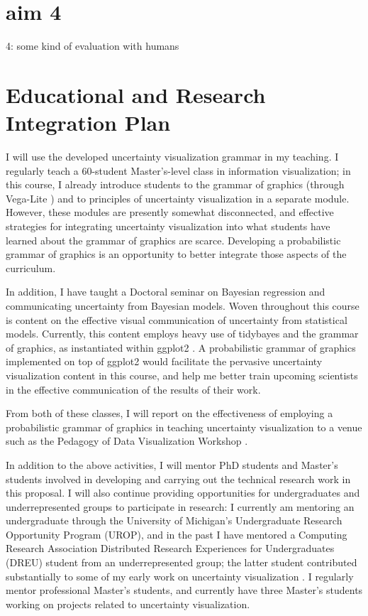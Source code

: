 \documentclass[11pt]{article}
\begin{document}
\section{aim 4}

4: some kind of evaluation with humans

\section{Educational and Research Integration Plan}

\noindent I will use the developed uncertainty visualization grammar in my teaching. I regularly teach a 60-student Master's-level class in information visualization; in this course, I already introduce students to the
grammar of graphics (through Vega-Lite \cite{satyanarayan2017vega}) and to principles of uncertainty visualization in a separate module. However, these modules are presently somewhat disconnected, and effective strategies for
integrating uncertainty visualization into what students have learned about the grammar of graphics are scarce. Developing a probabilistic grammar of graphics is an opportunity to better integrate those aspects
of the curriculum.

In addition, I have taught a Doctoral seminar on Bayesian regression and communicating uncertainty from Bayesian models. Woven throughout this course is content on the effective visual communication of uncertainty
from statistical models. Currently, this content employs heavy use of tidybayes \cite{kay2017tidybayes} and the grammar of graphics, as instantiated within ggplot2 \cite{wickham2016ggplot2}. A probabilistic grammar of graphics implemented on top of ggplot2 would facilitate the pervasive uncertainty visualization content in this course, and help me better train upcoming scientists in the effective communication of the results of their work.

From both of these classes, I will report on the effectiveness of employing a probabilistic grammar of graphics in teaching uncertainty visualization to a venue such as the Pedagogy of Data Visualization Workshop \cite{pdvw}.

In addition to the above activities, I will mentor PhD students and Master's students involved in developing and carrying out the technical research work in this proposal. I will also continue providing opportunities for undergraduates and underrepresented groups to participate in research: I currently am mentoring an undergraduate through the University of Michigan's Undergraduate Research Opportunity Program (UROP), and in the past I have
mentored a Computing Research Association Distributed Research Experiences for Undergraduates (DREU) student from an underrepresented group; the latter student contributed substantially to some of my early work on uncertainty visualization \cite{kay2016bus}. I regularly mentor professional Master's students, and currently have three Master's students working on projects related to uncertainty visualization.
\end{document}
